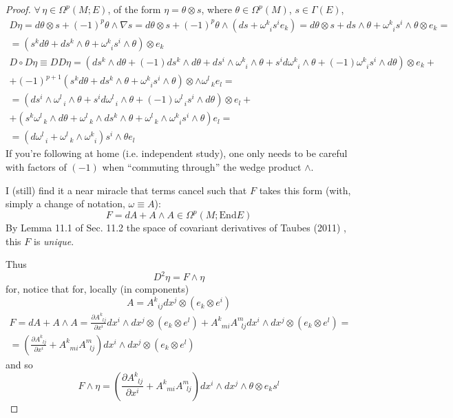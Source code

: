 \documentclass[10pt]{amsart}
\begin{document}
\begin{multicols}{2}
\begin{proof}
$\forall \, \eta \in \Omega^p(M;E)$, of the form $\eta = \theta \otimes s$, where $\theta \in \Omega^p(M)$, $s\in \Gamma(E)$, 
\[
\begin{gathered}
  D\eta = d\theta \otimes s + (-1)^p \theta \wedge \nabla s = d\theta \otimes s + (-1)^p \theta \wedge (ds + \omega^k_{ \; \; i } s^i e_k) = d\theta \otimes s + ds \wedge \theta + \omega^k_{ \; \; i} s^i \wedge \theta \otimes e_k = \\
  = (s^k d\theta + ds^k \wedge \theta + \omega^k_{ \; \; i } s^i \wedge \theta ) \otimes e_k 
\end{gathered}
\]
\[
\begin{gathered}
  D\circ D \eta \equiv DD\eta = (ds^k \wedge d\theta + (-1)ds^k \wedge d\theta + ds^i \wedge \omega^k_{ \; \; i} \wedge \theta + s^i d\omega^k_{ \; \; i } \wedge \theta + (-1) \omega^k_{ \; \; i} s^i \wedge d\theta ) \otimes e_k +\\
  + (-1)^{p+1}(s^k d\theta + ds^k \wedge \theta + \omega^k_{ \; \; i} s^i \wedge \theta ) \otimes \wedge \omega^l_{ \; \; k} e_l = \\
  = (ds^i \wedge \omega^l_{ \; \; i} \wedge \theta + s^i d\omega^l_{ \; \; i} \wedge \theta + (-1) \omega^l_{ \; \; i} s^i \wedge d\theta ) \otimes e_l + \\
  + (s^k \omega^l_{ \; \; k} \wedge d\theta + \omega^l_{ \; \; k } \wedge ds^k \wedge \theta + \omega^l_{ \; \; k} \wedge \omega^k_{ \; \; i } s^i \wedge \theta ) e_l = \\
  = (d\omega^l_{ \; \; i} + \omega^l_{ \; \; k } \wedge \omega^k_{ \; \; i} )s^i \wedge \theta e_l
\end{gathered}
\]
If you're following at home (i.e. independent study), one only needs to be careful with factors of $(-1)$ when ``commuting through'' the wedge product $\wedge$.  

I (still) find it a near miracle that terms cancel such that $F$ takes this form (with, simply a change of notation, $\omega \equiv A$):
\[
F = dA + A\wedge A \in \Omega^p(M;\text{End}E)
\]
By Lemma 11.1 of Sec. 11.2 the space of covariant derivatives of Taubes (2011) \cite{CTaubes2011}, this $F$ is \emph{unique}.  

Thus
\[
D^2 \eta = F \wedge \eta 
\]
for, notice that for, locally (in components)
\[
A = A^k_{ \; \; ij} dx^j \otimes (e_k \otimes e^i)
\]
\[
\begin{gathered}
  F = dA + A \wedge A = \frac{ \partial A^k_{ \; \; lj} }{  \partial x^i } dx^i \wedge dx^j \otimes (e_k \otimes e^l) + A^k_{  \; \; mi } A^m_{ \; \; lj } dx^i \wedge dx^j \otimes (e_k \otimes e^l) = \\
  = \left( \frac{ \partial A^k_{ \; \; lj} }{ \partial x^i} + A^k_{ \; \; mi} A^m_{ \; \; lj } \right) dx^i \wedge dx^j \otimes (e_k \otimes e^l )
\end{gathered}
\]
and so
\[
F\wedge \eta = \left( \frac{ \partial A^k_{ \; \; lj} }{ \partial x^i } + A^k_{ \; \; mi} A^m_{ \; \; lj } \right) dx^i \wedge dx^j \wedge \theta \otimes e_k s^l
\]
\end{proof}


\end{multicols}
\end{document}
